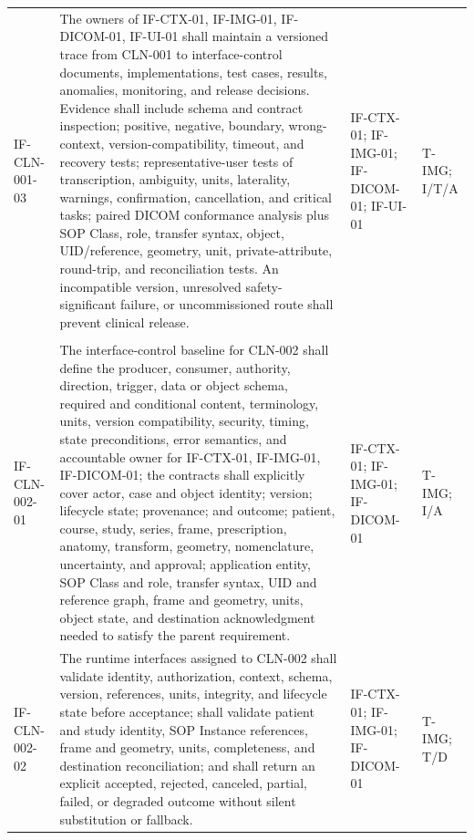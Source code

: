 \documentclass[11pt,letterpaper]{article}
\begin{document}
\begin{scriptsize}
\begin{longtable}{@{}L{0.14\textwidth}L{0.49\textwidth}L{0.19\textwidth}L{0.10\textwidth}@{}}
\addlinespace[2pt]
\mbox{IF-CLN-001-03} & The owners of IF-CTX-01, IF-IMG-01, IF-DICOM-01, IF-UI-01 shall maintain a versioned trace from CLN-001 to interface-control documents, implementations, test cases, results, anomalies, monitoring, and release decisions. Evidence shall include schema and contract inspection; positive, negative, boundary, wrong-context, version-compatibility, timeout, and recovery tests; representative-user tests of transcription, ambiguity, units, laterality, warnings, confirmation, cancellation, and critical tasks; paired DICOM conformance analysis plus SOP Class, role, transfer syntax, object, UID\slash\allowbreak{}reference, geometry, unit, private-attribute, round-trip, and reconciliation tests. An incompatible version, unresolved safety-significant failure, or uncommissioned route shall prevent clinical release. & IF-CTX-01; IF-IMG-01; IF-DICOM-01; IF-UI-01 & T-IMG; I\slash\allowbreak{}T\slash\allowbreak{}A \\
\addlinespace[2pt]
 \\
\addlinespace[2pt]
\mbox{IF-CLN-002-01} & The interface-control baseline for CLN-002 shall define the producer, consumer, authority, direction, trigger, data or object schema, required and conditional content, terminology, units, version compatibility, security, timing, state preconditions, error semantics, and accountable owner for IF-CTX-01, IF-IMG-01, IF-DICOM-01; the contracts shall explicitly cover actor, case and object identity; version; lifecycle state; provenance; and outcome; patient, course, study, series, frame, prescription, anatomy, transform, geometry, nomenclature, uncertainty, and approval; application entity, SOP Class and role, transfer syntax, UID and reference graph, frame and geometry, units, object state, and destination acknowledgment needed to satisfy the parent requirement. & IF-CTX-01; IF-IMG-01; IF-DICOM-01 & T-IMG; I\slash\allowbreak{}A \\
\addlinespace[2pt]
\mbox{IF-CLN-002-02} & The runtime interfaces assigned to CLN-002 shall validate identity, authorization, context, schema, version, references, units, integrity, and lifecycle state before acceptance; shall validate patient and study identity, SOP Instance references, frame and geometry, units, completeness, and destination reconciliation; and shall return an explicit accepted, rejected, canceled, partial, failed, or degraded outcome without silent substitution or fallback. & IF-CTX-01; IF-IMG-01; IF-DICOM-01 & T-IMG; T\slash\allowbreak{}D \\

\end{longtable}
\end{scriptsize}
\end{document}
